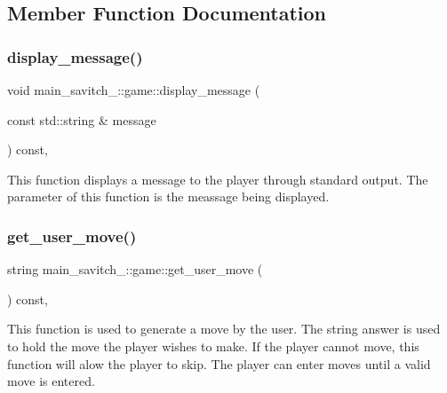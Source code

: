 \subsection{Member Function Documentation}
\mbox{\label{classmain__savitch__14_1_1game_ac58bfc07db8e604b07d2039b2cf7ab51}} 
\subsubsection{\texorpdfstring{display\+\_\+message()}{display\_message()}}
{\footnotesize\ttfamily void main\+\_\+savitch\+\_\+::game\+::display\+\_\+message (\begin{DoxyParamCaption}\item[{const std\+::string \&}]{message }\end{DoxyParamCaption}) const\hspace{0.3cm}{\ttfamily [protected]}, {\ttfamily [virtual]}}

This function displays a message to the player through standard output. The parameter of this function is the meassage being displayed. \mbox{\label{classmain__savitch__14_1_1game_a6504d401fcc8b138ae6342c2868c8a40}} 
\subsubsection{\texorpdfstring{get\+\_\+user\+\_\+move()}{get\_user\_move()}}
{\footnotesize\ttfamily string main\+\_\+savitch\+\_\+::game\+::get\+\_\+user\+\_\+move (\begin{DoxyParamCaption}{ }\end{DoxyParamCaption}) const\hspace{0.3cm}{\ttfamily [protected]}, {\ttfamily [virtual]}}

This function is used to generate a move by the user. The string answer is used to hold the move the player wishes to make. If the player cannot move, this function will alow the player to skip. The player can enter moves until a valid move is entered. \mbox{\label{classmain__savitch__14_1_1game_a4dbeaddb78059f7c5dcbf5cc4e026317}} 
